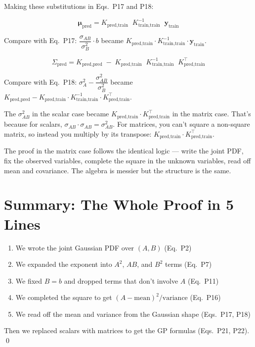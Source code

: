 \documentclass[11pt, a4paper]{article}
\newcommand{\gut}[1]{\begin{tcolorbox}[colback=lightyellow, colframe=orange!50, title=Gut feeling]#1\end{tcolorbox}}
\begin{document}
\bigskip
Making these substitutions in Eqs.~P17 and P18:

\begin{equation}
\boxed{\boldsymbol{\mu}_{\text{pred}} = K_{\text{pred,train}} \;\; K_{\text{train,train}}^{-1} \;\; \mathbf{y}_{\text{train}}}
\tag{P21}
\end{equation}

Compare with Eq.~P17: $\dfrac{\sigma_{AB}}{\sigma_B^2} \cdot b$ became $K_{\text{pred,train}} \cdot K_{\text{train,train}}^{-1} \cdot \mathbf{y}_{\text{train}}$.

\begin{equation}
\boxed{\Sigma_{\text{pred}} = K_{\text{pred,pred}} \;-\; K_{\text{pred,train}} \;\; K_{\text{train,train}}^{-1} \;\; K_{\text{pred,train}}^\top}
\tag{P22}
\end{equation}

Compare with Eq.~P18: $\sigma_A^2 - \dfrac{\sigma_{AB}^2}{\sigma_B^2}$ became $K_{\text{pred,pred}} - K_{\text{pred,train}} \cdot K_{\text{train,train}}^{-1} \cdot K_{\text{pred,train}}^\top$.

\gut{
The $\sigma_{AB}^2$ in the scalar case became $K_{\text{pred,train}} \cdot K_{\text{pred,train}}^\top$ in the matrix case. That's because for scalars, $\sigma_{AB} \cdot \sigma_{AB} = \sigma_{AB}^2$. For matrices, you can't square a non-square matrix, so instead you multiply by its transpose: $K_{\text{pred,train}} \cdot K_{\text{pred,train}}^\top$.
}

\bigskip
The proof in the matrix case follows the identical logic --- write the joint PDF, fix the observed variables, complete the square in the unknown variables, read off mean and covariance. The algebra is messier but the structure is the same.


\section*{\color{secblue}Summary: The Whole Proof in 5 Lines}

\begin{enumerate}
\item We wrote the joint Gaussian PDF over $(A, B)$ \hfill (Eq.~P2)
\item We expanded the exponent into $A^2$, $AB$, and $B^2$ terms \hfill (Eq.~P7)
\item We fixed $B = b$ and dropped terms that don't involve $A$ \hfill (Eq.~P11)
\item We completed the square to get $(A - \text{mean})^2 / \text{variance}$ \hfill (Eq.~P16)
\item We read off the mean and variance from the Gaussian shape \hfill (Eqs.~P17, P18)
\end{enumerate}

Then we replaced scalars with matrices to get the GP formulas (Eqs.~P21, P22). \qed
\end{document}
